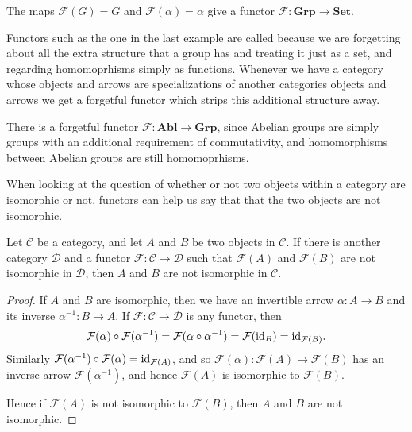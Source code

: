 \begin{example}
  The maps $\mathcal{F}(G) = G$ and $\mathcal{F}(\alpha) = \alpha$ 
  give a functor $\mathcal{F} : \mathbf{Grp} \to \mathbf{Set}$.
\end{example}

Functors such as the one in the last example are called
 because we are forgetting
about all the extra structure that a group has and treating it just as
a set, and regarding homomoprhisms simply as functions.  Whenever we
have a category whose objects and arrows are specializations of
another categories objects and arrows we get a forgetful functor which
strips this additional structure away.

\begin{example}
  There is a forgetful functor $\mathcal{F} : \mathbf{Abl} \to
  \mathbf{Grp}$, since Abelian groups are simply groups with an
  additional requirement of commutativity, and homomorphisms between
  Abelian groups are still homomoprhisms.
\end{example}

When looking at the question of whether or not two objects within a
category are isomorphic or not, functors can help us say that that the two
objects are not isomorphic.

\begin{proposition}
  Let $\mathcal{C}$ be a category, and let $A$ and $B$ be two objects in
  $\mathcal{C}$.  If there is another category $\mathcal{D}$ and a functor
  $\mathcal{F}: \mathcal{C} \to \mathcal{D}$ such that $\mathcal{F}(A)$ and
  $\mathcal{F}(B)$ are not isomorphic in $\mathcal{D}$, then $A$ and $B$ are
  not isomorphic in $\mathcal{C}$.
\end{proposition}
\begin{proof}
  If $A$ and $B$ are isomorphic, then we have an invertible arrow $\alpha : A
  \to B$ and its inverse $\alpha^{-1} : B \to A$.  If $\mathcal{F}: \mathcal{C}
  \to \mathcal{D}$ is any functor, then
  \[
    \mathcal{F}(\alpha) \circ \mathcal{F}(\alpha^{-1}) = \mathcal{F}(\alpha
    \circ \alpha^{-1}) = \mathcal{F}(\text{id}_{B}) = \text{id}_{\mathcal{F}(B)}.
  \]
  Similarly $\mathcal{F}(\alpha^{-1}) \circ \mathcal{F}(\alpha) =
  \text{id}_{\mathcal{F}(A)}$, and so $\mathcal{F}(\alpha) : \mathcal{F}(A) \to
  \mathcal{F}(B)$ has an inverse arrow $\mathcal{F}(\alpha^{-1})$, and hence
  $\mathcal{F}(A)$ is isomorphic to $\mathcal{F}(B)$.
  
  Hence if $\mathcal{F}(A)$ is not isomorphic to $\mathcal{F}(B)$, then $A$ and
  $B$ are not isomorphic.
\end{proof}

